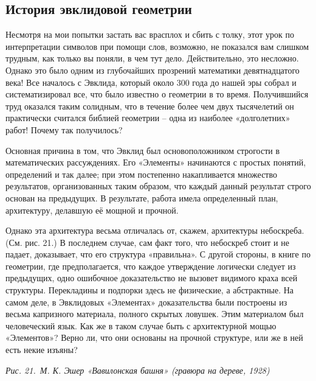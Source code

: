 \documentclass[../main.tex]{subfiles}
\begin{document}
\subsection{История эвклидовой геометрии}

Несмотря на мои попытки застать вас врасплох и сбить с толку, этот урок по интерпретации символов при помощи слов, возможно, не показался вам слишком трудным, как только вы поняли, в чем тут дело. Действительно, это несложно. Однако это было одним из глубочайших прозрений математики девятнадцатого века! Все началось с Эвклида, который около 300 года до нашей эры собрал и систематизировал все, что было известно о геометрии в то время. Получившийся труд оказался таким солидным, что в течение более чем двух тысячелетий он практически считался библией геометрии \--- одна из наиболее «долголетних» работ! Почему так получилось?

Основная причина в том, что Эвклид был основоположником строгости в математических рассуждениях. Его «Элементы» начинаются с простых понятий, определений и так далее; при этом постепенно накапливается множество результатов, организованных таким образом, что каждый данный результат строго основан на предыдущих. В результате, работа имела определенный план, архитектуру, делавшую её мощной и прочной.

Однако эта архитектура весьма отличалась от, скажем, архитектуры небоскреба. (См. рис. 21.) В последнем случае, сам факт того, что небоскреб стоит и не падает, доказывает, что его структура «правильна». С другой стороны, в книге по геометрии, где предполагается, что каждое утверждение логически следует из предыдущих, одно ошибочное доказательство не вызовет видимого краха всей структуры. Перекладины и подпорки здесь не физические, а абстрактные. На самом деле, в Эвклидовых «Элементах» доказательства были построены из весьма капризного материала, полного скрытых ловушек. Этим материалом был человеческий язык. Как же в таком случае быть с архитектурной мощью «Элементов»? Верно ли, что они основаны на прочной структуре, или же в ней есть некие изъяны?

\emph{Рис. 21.~М. К. Эшер «Вавилонская башня» (гравюра на дереве, 1928)}
\end{document}
